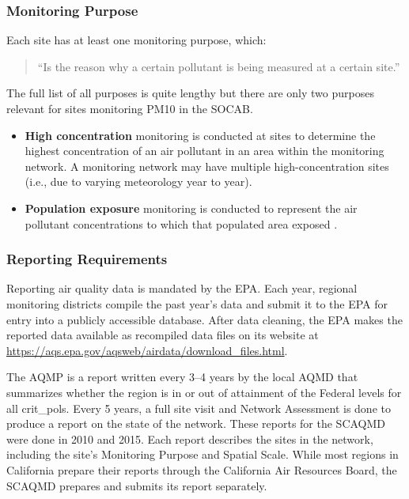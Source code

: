 \subsubsection*{Monitoring Purpose}
\label{subsubsec:purpose}
Each site has at least one monitoring purpose, which: 
\begin{quote}
	``Is the reason why a certain pollutant is being measured at a certain site.'' \citep{AQMNP:2019} 
\end{quote} The full list of all purposes 
is quite lengthy
but there are only two purposes relevant for sites monitoring \ac{PM10} in the \ac{SOCAB}.  
\begin{itemize}
	\item \textbf{High concentration} monitoring is conducted at sites to determine the highest concentration of an air pollutant in an area within the monitoring network. A monitoring network may have multiple high-concentration sites (i.e., due to varying meteorology year to year).
	\item \textbf{Population exposure} monitoring is conducted to represent the air pollutant concentrations to which that populated area exposed 
	\citep{AQMNP:2019}.
\end{itemize}


\subsubsection*{Reporting Requirements}
\label{subsubsec:ReportingRequirements}
Reporting air quality data is mandated by the \ac{EPA}.  Each year, regional monitoring districts compile the past year's data and submit it to the \ac{EPA} for entry into a publicly accessible database.  After data cleaning, the \ac{EPA} makes the reported data available as recompiled data files on its website at \url{https://aqs.epa.gov/aqsweb/airdata/download_files.html}.  

The \ac{AQMP} is a report written every 3–4 years by the local \ac{AQMD} that summarizes whether the region is in or out of attainment of the Federal levels for all \glspl{crit_pol}.
Every 5 years, a full site visit and Network Assessment is done to produce a report on the state of the network. These reports for the \ac{SCAQMD} were done in 2010 and 2015.  Each report describes the sites in the network, including the site's Monitoring Purpose and Spatial Scale.  While most regions in California prepare their reports through the California Air Resources Board, the \ac{SCAQMD} prepares and submits its report separately.



